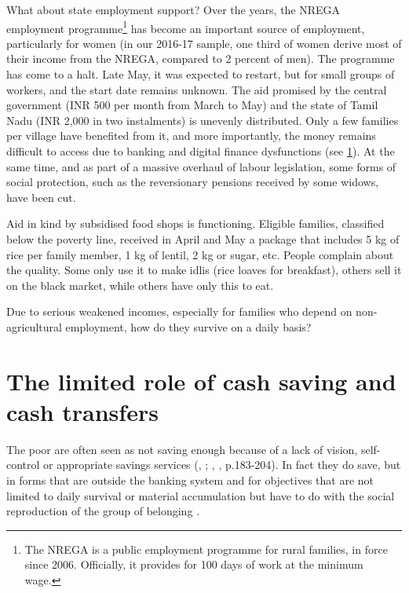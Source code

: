 \documentclass[a4paper, 11pt, onecolumn]{article}
\begin{document}
What about state employment support? Over the years, the NREGA employment programme\footnote{The NREGA is a public employment programme for rural families, in force since 2006. Officially, it provides for 100 days of work at the minimum wage.}  has become an important source of employment, particularly for women (in our 2016-17 sample, one third of women derive most of their income from the NREGA, compared to 2 percent of men). The programme has come to a halt. Late May, it was expected to restart, but for small groups of workers, and the start date remains unknown. The aid promised by the central government (INR 500 per month from March to May) and the state of Tamil Nadu (INR 2,000 in two instalments) is unevenly distributed. Only a few families per village have benefited from it, and more importantly, the money remains difficult to access due to banking and digital finance dysfunctions (see \ref{section:saving}). At the same time, and as part of a massive overhaul of labour legislation, some forms of social protection, such as the reversionary pensions received by some widows, have been cut.

Aid in kind by subsidised food shops is functioning. Eligible families, classified below the poverty line, received in April and May a package that includes 5 kg of rice per family member, 1 kg of lentil, 2 kg or sugar, etc. People complain about the quality. Some only use it to make idlis (rice loaves for breakfast), others sell it on the black market, while others have only this to eat.

Due to serious weakened incomes, especially for families who depend on non-agricultural employment, how do they survive on a daily basis? 

\section{The limited role of cash saving and cash transfers}
\label{section:saving}

The poor are often seen as not saving enough because of a lack of vision, self-control or appropriate savings services (\citeauthor{Karlan2014}, \citeyear{Karlan2014}; \citeauthor{Banerjee2011}, \citeyear{Banerjee2011}, p.183-204). In fact they do save, but in forms that are outside the banking system \citep{Collins2009, Rutherford2000, Peebles2014, Peebles2020, Goedecke2017, Guerin2019} and for objectives that are not limited to daily survival or material accumulation but have to do with the social reproduction of the group of belonging \citep{Peebles2014, Douglas1980}.
\end{document}
